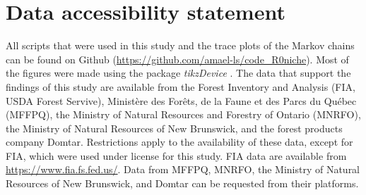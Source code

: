\section{Data accessibility statement}
All scripts that were used in this study and the trace plots of the Markov chains can be found on Github (\url{https://github.com/amael-ls/code_R0niche}). Most of the figures were made using the package \textit{tikzDevice} \citep{tikzDevice}. The data that support the findings of this study are available from the Forest Inventory and Analysis (FIA, USDA Forest Servive), Ministère des Forêts, de la Faune et des Parcs du Québec (MFFPQ), the Ministry of Natural Resources and Forestry of Ontario (MNRFO), the Ministry of Natural Resources of New Brunswick, and the forest products company Domtar. Restrictions apply to the availability of these data, except for FIA, which were used under license for this study. FIA data are available from \url{https://www.fia.fs.fed.us/}. Data from MFFPQ, MNRFO, the Ministry of Natural Resources of New Brunswick, and Domtar can be requested from their platforms.

